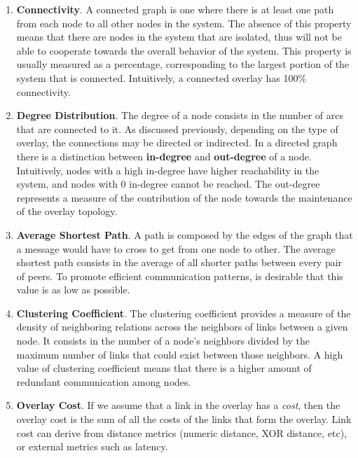 \begin{enumerate}
    
    \item \textbf{Connectivity}. A connected graph is one where there is at least one path from each node to all other nodes in the system. The absence of this property means that there are nodes in the system that are isolated, thus will not be able to cooperate towards the overall behavior of the system. This property is usually measured as a percentage, corresponding to the largest portion of the system that is connected. Intuitively, a  connected overlay has 100\% connectivity.
    
    \item \textbf{Degree Distribution}. The degree of a node consists in the number of arcs that are connected to it. As discussed previously, depending on the type of overlay, the connections may be directed or indirected. In a directed graph there is a distinction between \textbf{in-degree} and \textbf{out-degree} of a node. Intuitively, nodes with a high in-degree have higher reachability in the system, and nodes with 0 in-degree cannot be reached. The out-degree represents a measure of the contribution of the node towards the maintenance of the overlay topology.
    
    \item \textbf{Average Shortest Path}. A path is composed by the edges of the graph that a message would have to cross to get from one node to other. The average shortest path consists in the average of all shorter paths between every pair of peers. To promote efficient communication patterns, is desirable that this value is as low as possible.
    
    \item \textbf{Clustering Coefficient}. The clustering coefficient provides a measure of the density of neighboring relations across the neighbors of links between a given node. It consists in the number of a node's neighbors divided by the maximum number of links that could exist between those neighbors. A high value of clustering coefficient means that there is a higher amount of redundant communication among nodes.
    
    \item \textbf{Overlay Cost}. If we assume that a link in the overlay has a \textit{cost}, then the overlay cost is the sum of all the costs of the links that form the overlay. Link cost can derive from distance metrics (numeric distance, XOR distance, etc), or external metrics such as latency.
    
\end{enumerate}

